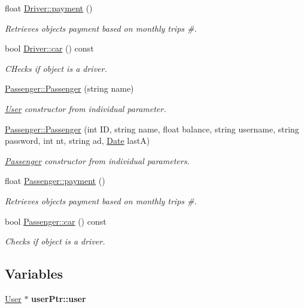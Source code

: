 \begin{DoxyCompactItemize}
float \hyperlink{group___user_ga3e6ec3270b94d43b3865b326e5bcd381}{Driver\+::payment} ()
\begin{DoxyCompactList}\small\item\em Retrieves object\textquotesingle{}s payment based on monthly trips \#. \end{DoxyCompactList}\item 
bool \hyperlink{group___user_gaf8b79bce2879830b12e6f3ec954192a2}{Driver\+::car} () const
\begin{DoxyCompactList}\small\item\em C\+Hecks if object is a driver. \end{DoxyCompactList}\item 
\hyperlink{group___user_ga00628e580d270e68278cc76994c841b1}{Passenger\+::\+Passenger} (string name)
\begin{DoxyCompactList}\small\item\em \hyperlink{class_user}{User} constructor from individual parameter. \end{DoxyCompactList}\item 
\hyperlink{group___user_ga0c1aecc465a9e8887f2b9bd3e784438a}{Passenger\+::\+Passenger} (int ID, string name, float balance, string username, string password, int nt, string ad, \hyperlink{class_date}{Date} lastA)
\begin{DoxyCompactList}\small\item\em \hyperlink{class_passenger}{Passenger} constructor from individual parameters. \end{DoxyCompactList}\item 
float \hyperlink{group___user_ga9535b6486d1f33f055d6c7385780ec68}{Passenger\+::payment} ()
\begin{DoxyCompactList}\small\item\em Retrieves object\textquotesingle{}s payment based on monthly trips \#. \end{DoxyCompactList}\item 
bool \hyperlink{group___user_gaeb69b29d53079577e41f070da1f442dd}{Passenger\+::car} () const
\begin{DoxyCompactList}\small\item\em Checks if object is a driver. \end{DoxyCompactList}\end{DoxyCompactItemize}
\subsection*{Variables}
\begin{DoxyCompactItemize}
\item 
\mbox{\label{group___user_gaf4eccff4aa6f642f1d6ab972abae9c21}} 
\hyperlink{class_user}{User} $\ast$ {\bfseries user\+Ptr\+::user}
\end{DoxyCompactItemize}
